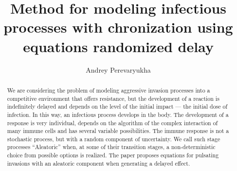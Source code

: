 \begin{englishtitle} %
\title{Method for modeling infectious processes with chronization using equations randomized delay}
\author{Andrey Perevaryukha 
  }
 
\maketitle

\begin{abstract}
We are considering the problem of modeling aggressive invasion processes into a competitive environment that offers resistance, but the development of a reaction is indefinitely delayed and depends on the level of the initial impact --- the initial dose of infection. In this way, an infectious process develops in the body. The development of a response is very individual, depends on the algorithm of the complex interaction of many immune cells and has several variable possibilities. The immune response is not a stochastic process, but with a random component of uncertainty. We call such stage processes “Aleatoric” when, at some of their transition stages, a non-deterministic choice from possible options is realized. The paper proposes equations for pulsating invasions with an aleatoric component when generating a delayed effect.

\end{abstract}
\end{englishtitle}

\iffalse
%
%





\documentclass[12pt]{llncs}  

\usepackage{iftex}

